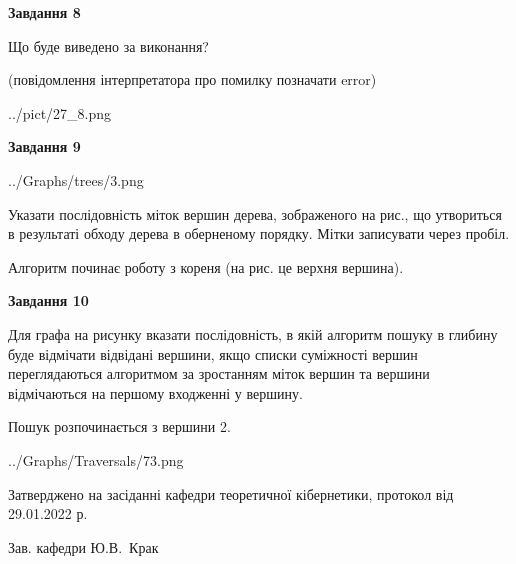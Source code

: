 \documentclass[12pt, ukrainian]{article}
\begin{document}
{\begin {large}
{\begin {center}\textbf{Завдання 8}\end {center}}\par
Що буде виведено за виконання?\par
 (повідомлення інтерпретатора про помилку позначати error)\par
\begin{center}
	{../pict/27_8.png}
\end{center}
\newpage

{\begin {center}\textbf{Завдання 9}\end {center}}\par

\begin{center}
	{../Graphs/trees/3.png}
\end{center}
Указати послідовність міток вершин дерева, зображеного на рис., що утвориться в результаті обходу дерева в оберненому порядку. Мітки записувати через пробіл.\par Алгоритм починає роботу з кореня (на рис. це верхня вершина).\par
\newpage

{\begin {center}\textbf{Завдання 10}\end {center}}\par
Для графа на рисунку вказати послідовність, в якій алгоритм пошуку в глибину буде відмічати відвідані вершини, якщо списки суміжності вершин переглядаються алгоритмом за зростанням міток вершин та вершини відмічаються на першому вход\-женні у вершину.\par
Пошук розпочинається з вершини 2.\par

\begin{center}
	{../Graphs/Traversals/73.png}
\end{center}\par
\newpage


\end {large}
}
{\smallskip \begin {small} Затверджено на засіданні кафедри теоретичної кібернетики, протокол  від   29.01.2022 р.\par\smallskip\smallskip
{\parbox {6.5 cm}{Зав. кафедри \dotfill Ю.В.~Крак}} \end{small}}
\end{document}
